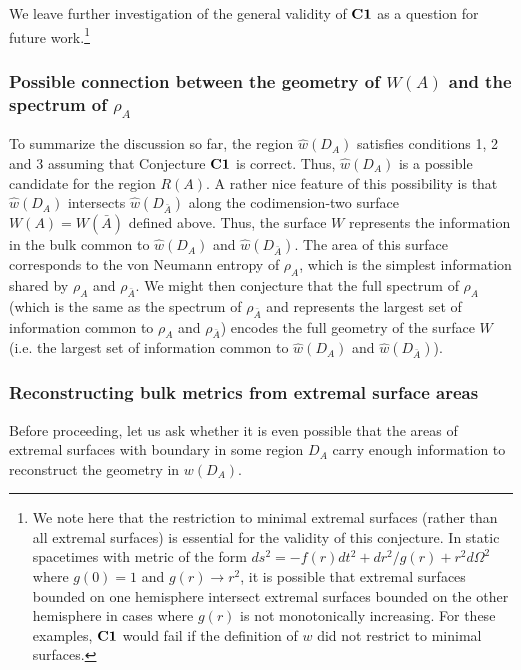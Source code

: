 \documentclass[12pt]{article}
\renewcommand{\(}{\left(}
\renewcommand{\)}{\right)}
\begin{document}
We leave further investigation of the general validity of ${\bf C1}$ as a question for future work.\footnote{We note here that the restriction to minimal extremal surfaces (rather than all extremal surfaces) is essential for the validity of this conjecture. In static spacetimes with metric of the form $ds^2 = -f(r)dt^2 + dr^2/g(r) + r^2 d \Omega^2$ where $g(0)=1$ and $g(r) \to r^2$, it is possible that extremal surfaces bounded on one hemisphere intersect extremal surfaces bounded on the other hemisphere in cases where $g(r)$ is not monotonically increasing. For these examples, ${\bf C1}$ would fail if the definition of $w$ did not restrict to minimal surfaces.}


\subsubsection*{Possible connection between the geometry of $W(A)$ and the spectrum of $\rho_A$}

To summarize the discussion so far, the region $\hat{w}(D_A)$ satisfies conditions 1, 2 and 3 assuming that Conjecture ${\bf C1}$ is correct. Thus, $\hat w(D_A)$ is a possible candidate for the region $R(A)$. A rather nice feature of this possibility is that $\hat{w}(D_A)$ intersects $\hat{w}(D_{\bar{A}})$ along the codimension-two surface $W(A)=W(\bar{A})$ defined above. Thus, the surface $W$ represents the information in the bulk common to $\hat{w}(D_A)$ and $\hat{w}(D_{\bar{A}})$. The area of this surface corresponds to the von Neumann entropy of $\rho_A$, which is the simplest information shared by $\rho_A$ and $\rho_{\bar{A}}$. We might then conjecture that the full spectrum of $\rho_A$ (which is the same as the spectrum of $\rho_{\bar{A}}$ and represents the largest set of information common to $\rho_A$ and $\rho_{\bar{A}}$) encodes the full geometry of the surface $W$ (i.e. the largest set of information common to $\hat{w}(D_A)$ and $\hat{w}(D_{\bar{A}})$).

\subsubsection*{Reconstructing bulk metrics from extremal surface areas}

Before proceeding, let us ask whether it is even possible that the areas of extremal surfaces with boundary in some region $D_A$ carry enough information to reconstruct the geometry in $w(D_A)$.
\end{document}
